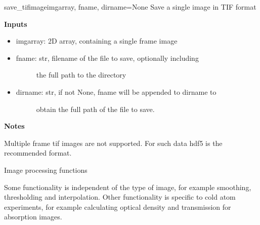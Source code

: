 \documentclass[letterpaper,10pt,english]{manual}
\begin{document}
\hypertarget{odysseus.imageio.save_tifimage}{}\begin{funcdesc}{save\_tifimage}{imgarray, fname, dirname=None}
Save a single image in TIF format

\textbf{Inputs}
\begin{itemize}
\item {} 
imgarray: 2D array, containing a single frame image

\item {} \begin{description}
\item[fname: str, filename of the file to save, optionally including] \leavevmode
the full path to the directory

\end{description}

\item {} \begin{description}
\item[dirname: str, if not None, fname will be appended to dirname to] \leavevmode
obtain the full path of the file to save.

\end{description}

\end{itemize}

\textbf{Notes}

Multiple frame tif images are not supported. For such data hdf5 is the
recommended format.
\end{funcdesc}
\hypertarget{module-odysseus.imageprocess}{}
\modulesynopsis{}
Image processing functions

Some functionality is independent of the type of image, for example
smoothing, thresholding and interpolation. Other functionality is specific
to cold atom experiments, for example calculating optical density and
transmission for absorption images.
\end{document}
